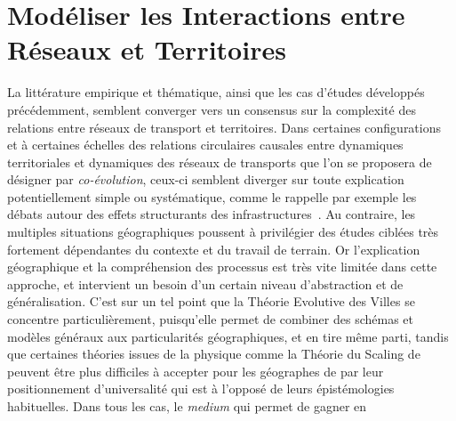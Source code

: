 

\chapter{Modéliser les Interactions entre Réseaux et Territoires}


\label{ch:modelinginteractions}





La littérature empirique et thématique, ainsi que les cas d'études développés précédemment, semblent converger vers un consensus sur la complexité des relations entre réseaux de transport et territoires. Dans certaines configurations et à certaines échelles des relations circulaires causales entre dynamiques territoriales et dynamiques des réseaux de transports que l'on se proposera de désigner par \emph{co-évolution}, ceux-ci semblent diverger sur toute explication potentiellement simple ou systématique, comme le rappelle par exemple les débats autour des effets structurants des infrastructures~\cite{offner1993effets}. Au contraire, les multiples situations géographiques poussent à privilégier des études ciblées très fortement dépendantes du contexte et du travail de terrain. Or l'explication géographique et la compréhension des processus est très vite limitée dans cette approche, et intervient un besoin d'un certain niveau d'abstraction et de généralisation. C'est sur un tel point que la Théorie Evolutive des Villes se concentre particulièrement, puisqu'elle permet de combiner des schémas et modèles généraux aux particularités géographiques, et en tire même parti, tandis que certaines théories issues de la physique comme la Théorie du Scaling de ~\cite{west2017scaling} peuvent être plus difficiles à accepter pour les géographes de par leur positionnement d'universalité qui est à l'opposé de leurs épistémologies habituelles. Dans tous les cas, le \emph{medium} qui permet de gagner en 